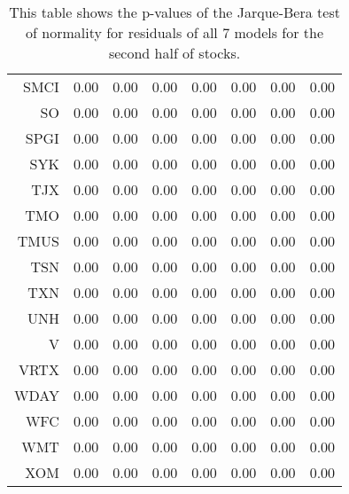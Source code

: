 \begin{table}[ht]
\begin{tabular}{rrrrrrrr}
  SMCI & 0.00 & 0.00 & 0.00 & 0.00 & 0.00 & 0.00 & 0.00 \\ 
  SO & 0.00 & 0.00 & 0.00 & 0.00 & 0.00 & 0.00 & 0.00 \\ 
  SPGI & 0.00 & 0.00 & 0.00 & 0.00 & 0.00 & 0.00 & 0.00 \\ 
  SYK & 0.00 & 0.00 & 0.00 & 0.00 & 0.00 & 0.00 & 0.00 \\ 
  TJX & 0.00 & 0.00 & 0.00 & 0.00 & 0.00 & 0.00 & 0.00 \\ 
  TMO & 0.00 & 0.00 & 0.00 & 0.00 & 0.00 & 0.00 & 0.00 \\ 
  TMUS & 0.00 & 0.00 & 0.00 & 0.00 & 0.00 & 0.00 & 0.00 \\ 
  TSN & 0.00 & 0.00 & 0.00 & 0.00 & 0.00 & 0.00 & 0.00 \\ 
  TXN & 0.00 & 0.00 & 0.00 & 0.00 & 0.00 & 0.00 & 0.00 \\ 
  UNH & 0.00 & 0.00 & 0.00 & 0.00 & 0.00 & 0.00 & 0.00 \\ 
  V & 0.00 & 0.00 & 0.00 & 0.00 & 0.00 & 0.00 & 0.00 \\ 
  VRTX & 0.00 & 0.00 & 0.00 & 0.00 & 0.00 & 0.00 & 0.00 \\ 
  WDAY & 0.00 & 0.00 & 0.00 & 0.00 & 0.00 & 0.00 & 0.00 \\ 
  WFC & 0.00 & 0.00 & 0.00 & 0.00 & 0.00 & 0.00 & 0.00 \\ 
  WMT & 0.00 & 0.00 & 0.00 & 0.00 & 0.00 & 0.00 & 0.00 \\ 
  XOM & 0.00 & 0.00 & 0.00 & 0.00 & 0.00 & 0.00 & 0.00 \\ 
   \hline
\end{tabular}
\caption[p-values of Jarque-Bera test on model residuals (2)]{This table shows the p-values of the Jarque-Bera test of normality for residuals 
              of all 7 models for the second half of stocks.} 
\label{Table:JBresid_p_vals_2}
\end{table}
